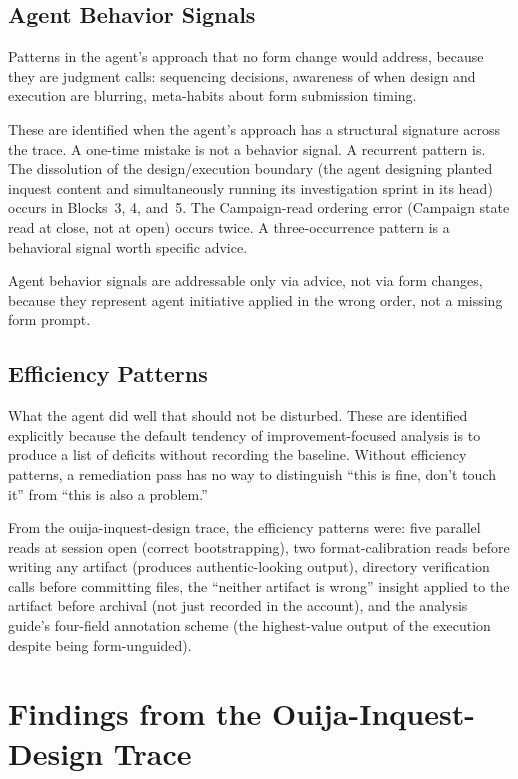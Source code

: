 \documentclass[11pt,a4paper]{article}
\begin{document}
\subsection{Agent Behavior Signals}

Patterns in the agent's approach that no form change would address, because
they are judgment calls: sequencing decisions, awareness of when design and
execution are blurring, meta-habits about form submission timing.

These are identified when the agent's approach has a structural signature
across the trace. A one-time mistake is not a behavior signal. A recurrent
pattern is. The dissolution of the design/execution boundary (the agent
designing planted inquest content and simultaneously running its investigation
sprint in its head) occurs in Blocks~3, 4, and~5. The Campaign-read ordering
error (Campaign state read at close, not at open) occurs twice. A
three-occurrence pattern is a behavioral signal worth specific advice.

Agent behavior signals are addressable only via advice, not via form changes,
because they represent agent initiative applied in the wrong order, not a
missing form prompt.

\subsection{Efficiency Patterns}

What the agent did well that should not be disturbed. These are identified
explicitly because the default tendency of improvement-focused analysis is to
produce a list of deficits without recording the baseline. Without efficiency
patterns, a remediation pass has no way to distinguish ``this is fine, don't
touch it'' from ``this is also a problem.''

From the ouija-inquest-design trace, the efficiency patterns were: five
parallel reads at session open (correct bootstrapping), two
format-calibration reads before writing any artifact (produces
authentic-looking output), directory verification calls before committing
files, the ``neither artifact is wrong'' insight applied to the artifact
before archival (not just recorded in the account), and the analysis guide's
four-field annotation scheme (the highest-value output of the execution
despite being form-unguided).

\section{Findings from the Ouija-Inquest-Design Trace}
\end{document}
